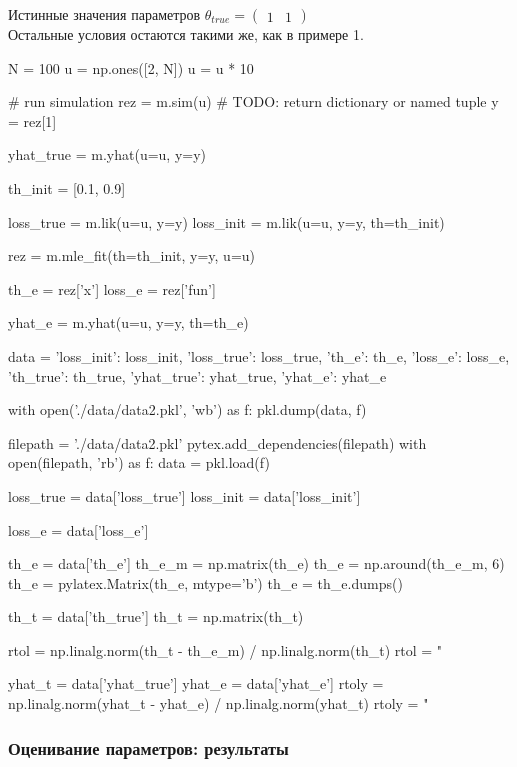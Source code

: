 \documentclass[a4paper,14pt]{extarticle}
\begin{document}
Истинные значения параметров
$\theta_{true} = \begin{pmatrix} 1 & 1 \end{pmatrix}$ \\

Остальные условия остаются такими же, как в примере 1.

\begin{pycode}[model2]
N = 100
u = np.ones([2, N])
u = u * 10

# run simulation
rez = m.sim(u)  # TODO: return dictionary or named tuple
y = rez[1]

yhat_true = m.yhat(u=u, y=y)

th_init = [0.1, 0.9]

loss_true = m.lik(u=u, y=y)
loss_init = m.lik(u=u, y=y, th=th_init)

rez = m.mle_fit(th=th_init, y=y, u=u)

th_e = rez['x']
loss_e = rez['fun']

yhat_e = m.yhat(u=u, y=y, th=th_e)

data = {'loss_init': loss_init,
        'loss_true': loss_true,
        'th_e': th_e,
        'loss_e': loss_e,
        'th_true': th_true,
        'yhat_true': yhat_true,
        'yhat_e': yhat_e}

with open('./data/data2.pkl', 'wb') as f:
    pkl.dump(data, f)
\end{pycode}

\begin{pycode}
filepath = './data/data2.pkl'
pytex.add_dependencies(filepath)
with open(filepath, 'rb') as f:
  data = pkl.load(f)

loss_true = data['loss_true']
loss_init = data['loss_init']

loss_e = data['loss_e']

th_e = data['th_e']
th_e_m = np.matrix(th_e)
th_e = np.around(th_e_m, 6)
th_e = pylatex.Matrix(th_e, mtype='b')
th_e = th_e.dumps()

th_t = data['th_true']
th_t = np.matrix(th_t)

rtol = np.linalg.norm(th_t - th_e_m) / np.linalg.norm(th_t)
rtol = "%

yhat_t = data['yhat_true']
yhat_e = data['yhat_e']
rtoly = np.linalg.norm(yhat_t - yhat_e) / np.linalg.norm(yhat_t)
rtoly = "%
\end{pycode}

\subsubsection{Оценивание параметров: результаты}
\end{document}
